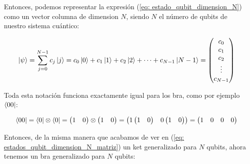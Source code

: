 \documentclass[12pt]{article}
\numberwithin{equation}{section} %
\begin{document}
    \vspace{2.5mm}

    Entonces, podemos representar la expresión (\ref{eq: estado_qubit_dimension_N}) como un vector columna de dimension \( N \), siendo \( N \) el número de qubits de nuestro sistema cuántico:

    \begin{equation}
        \ket{\psi} = \sum_{j = 0}^{N - 1} c_{j} \ket{j} = c_{0} \ket{0} + c_{1} \ket{1} + c_{2} \ket{2} + \cdots + c_{N - 1} \ket{N - 1} = \begin{pmatrix}
            c_{0} \\
            c_{1} \\
            c_{2} \\
            \vdots \\
            c_{N - 1}
        \end{pmatrix}
        \label{eq: estados_qubit_dimension_N_matriz}
    \end{equation}

    \vspace{2.5mm}

    Toda esta notación funciona exactamente igual para los bra, como por ejemplo \( \bra{0 0} \):

    \begin{equation*}
        \bra{0 0} = \bra{0} \otimes \bra{0} = \begin{pmatrix}
            1 & 0
        \end{pmatrix} \otimes \begin{pmatrix}
            1 & 0
        \end{pmatrix} = \begin{pmatrix}
            1 \begin{pmatrix} 1 & 0 \end{pmatrix} & 0 \begin{pmatrix} 1 & 0 \end{pmatrix}
        \end{pmatrix} = \begin{pmatrix}
            1 & 0 & 0 & 0
        \end{pmatrix}
    \end{equation*}

    \vspace{2.5mm}

    Entonces, de la misma manera que acabamos de ver en (\ref{eq: estados_qubit_dimension_N_matriz}) un ket generalizado para \( N \) qubits, ahora tenemos un bra generalizado para \( N \) qubits:
\end{document}
